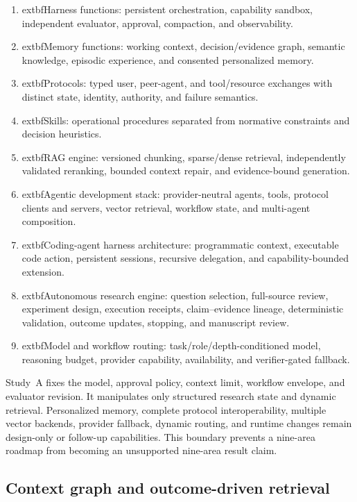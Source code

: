 \documentclass[11pt,a4paper]{article}
\begin{document}
\begin{enumerate}
  \item 	extbf{Harness functions:} persistent orchestration, capability sandbox,
  independent evaluator, approval, compaction, and observability.
  \item 	extbf{Memory functions:} working context, decision/evidence graph,
  semantic knowledge, episodic experience, and consented personalized memory.
  \item 	extbf{Protocols:} typed user, peer-agent, and tool/resource exchanges
  with distinct state, identity, authority, and failure semantics.
  \item 	extbf{Skills:} operational procedures separated from normative
  constraints and decision heuristics.
  \item 	extbf{RAG engine:} versioned chunking, sparse/dense retrieval,
  independently validated reranking, bounded context repair, and evidence-bound
  generation.
  \item 	extbf{Agentic development stack:} provider-neutral agents, tools,
  protocol clients and servers, vector retrieval, workflow state, and
  multi-agent composition.
  \item 	extbf{Coding-agent harness architecture:} programmatic context,
  executable code action, persistent sessions, recursive delegation, and
  capability-bounded extension.
  \item 	extbf{Autonomous research engine:} question selection, full-source
  review, experiment design, execution receipts, claim--evidence lineage,
  deterministic validation, outcome updates, stopping, and manuscript review.
  \item 	extbf{Model and workflow routing:} task/role/depth-conditioned model,
  reasoning budget, provider capability, availability, and verifier-gated
  fallback.
\end{enumerate}

Study~A fixes the model, approval policy, context limit, workflow envelope, and
evaluator revision.  It manipulates only structured research state and dynamic
retrieval.  Personalized memory, complete protocol interoperability, multiple
vector backends, provider fallback, dynamic routing, and runtime changes remain
design-only or follow-up capabilities.  This boundary prevents a nine-area
roadmap from becoming an unsupported nine-area result claim.

\subsection{Context graph and outcome-driven retrieval}
\end{document}
